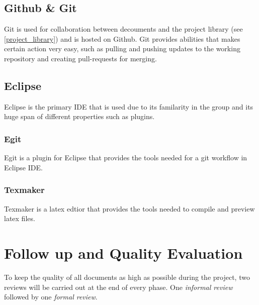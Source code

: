 \documentclass{article}
\begin{document}
    \subsection{Github \& Git}
    Git is used for collaboration between decouments and the project library (see \ref{project_library})
    and is hosted on Github. Git provides abilities that  makes certain action very
    easy, such as pulling and pushing updates to the working repository and creating pull-requests for merging.
    
    \subsection{Eclipse}
        Eclipse is the primary IDE that is used due to its familarity in
        the group and its huge span of different properties such as plugins.
    
        \subsubsection{Egit}
            Egit is a plugin for Eclipse that provides the tools needed for a git workflow 
            in Eclipse IDE.
            
        \subsubsection{Texmaker}
            Texmaker is a latex edtior that provides the tools needed to compile and preview latex files.
    
\section{Follow up and Quality Evaluation \label{followup}}
    To keep the quality of all documents as high as possible during the project,
    two reviews will be carried out at the end of every phase. One \textit{informal review}
    followed by one \textit{formal review}.
\end{document}
